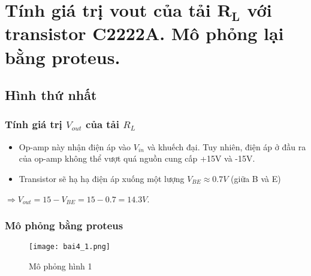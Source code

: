 \section{Tính giá trị vout của tải $\mathbf{R_L}$ với transistor C2222A. Mô phỏng lại bằng proteus.}
    \subsection{Hình thứ nhất}
        \subsubsection{Tính giá trị $V_{out}$ của tải $R_L$}
            \begin{itemize}
                \item Op-amp này nhận điện áp vào $V_{in}$ và khuếch đại. Tuy nhiên, điện áp ở đầu ra của op-amp không thể vượt quá nguồn cung cấp +15V và -15V.
                \item Transistor sẽ hạ hạ điện áp xuống một lượng $V_{BE} \approx 0.7V$ (giữa B và E) 
            \end{itemize}
            $\Rightarrow V_{out} = 15 - V_{BE} = 15 - 0.7 = 14.3V$.
        \subsubsection{Mô phỏng bằng proteus}
            \begin{figure}[H]
                \centering
                \texttt{[image: bai4\_1.png]}
                \caption{Mô phỏng hình 1}
            \end{figure}
        